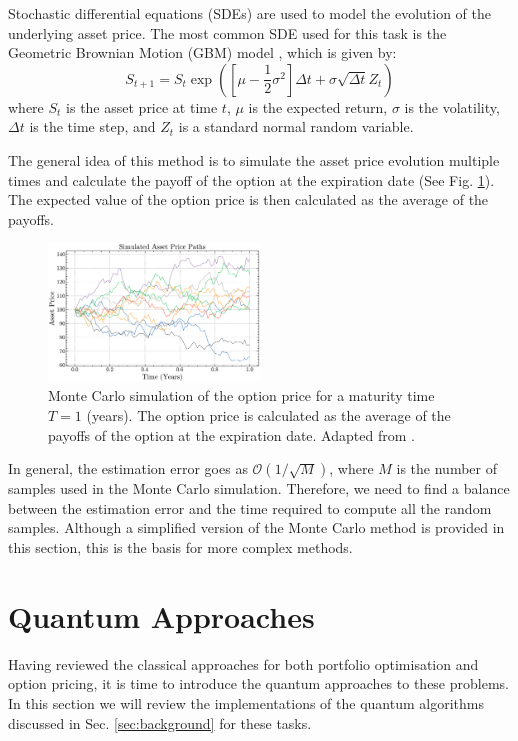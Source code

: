 \documentclass[prx,twocolumn,floatfix,superscriptaddress,longbibliography]{revtex4-1}
\begin{document}
Stochastic differential equations (SDEs) are used to model the evolution of the underlying asset price. The most common SDE used for this task is the Geometric Brownian Motion (GBM) model \cite{Sood2019}, which is given by:
\begin{equation}
  \label{eq:20}
  S_{t+1} = S_t \exp\left(\left[\mu - \frac{1}{2}\sigma^2\right]\Delta t + \sigma \sqrt{\Delta t}Z_t\right)
\end{equation}
where $S_t$ is the asset price at time $t$, $\mu$ is the expected return, $\sigma$ is the volatility, $\Delta t$ is the time step, and $Z_t$ is a standard normal random variable.

The general idea of this method is to simulate the asset price evolution multiple times and calculate the payoff of the option at the expiration date (See Fig. \ref{fig:monte-carlo-option}). The expected value of the option price is then calculated as the average of the payoffs.
\begin{figure}[h!]
\centering
\includegraphics[width=0.5\textwidth]{monte-carlo-paths.pdf}
  \caption{\label{fig:monte-carlo-option} Monte Carlo simulation of the option price for a maturity time $T =1$ (years). The option price is calculated as the average of the payoffs of the option at the expiration date. Adapted from \cite{Sood2019}.}
\end{figure}

In general, the estimation error goes as $\mathcal{O}(1/\sqrt{M})$, where $M$ is the number of samples used in the Monte Carlo simulation. Therefore, we need to find a balance between the estimation error and the time required to compute all the random samples. Although a simplified version of the Monte Carlo method is provided in this section, 
this is the basis for more complex methods. 

\section{Quantum Approaches}\label{sec:literature2}
Having reviewed the classical approaches for both portfolio optimisation and option pricing, it is time to 
introduce the quantum approaches to these problems. In this section we will review the implementations of the quantum algorithms discussed in Sec. \ref{sec:background} for these tasks.
\end{document}
